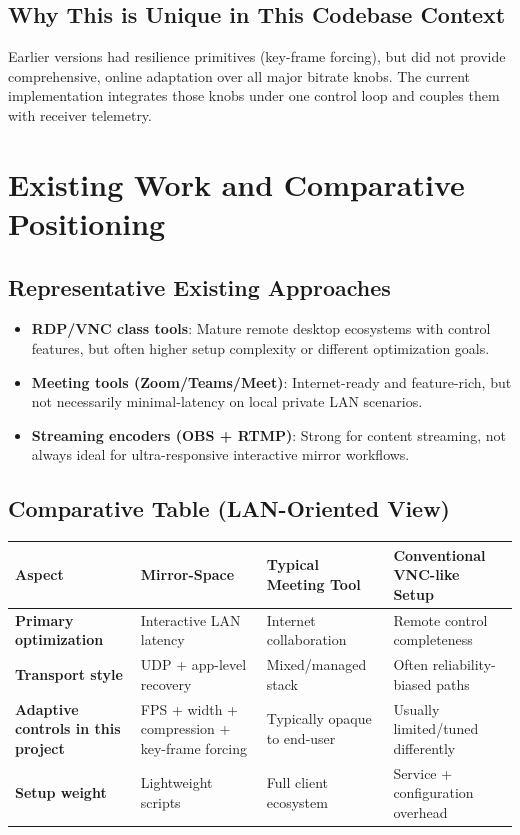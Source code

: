 \documentclass[12pt,a4paper]{article}
\begin{document}
\subsection{Why This is Unique in This Codebase Context}
Earlier versions had resilience primitives (key-frame forcing), but did not provide comprehensive, online adaptation over all major bitrate knobs. The current implementation integrates those knobs under one control loop and couples them with receiver telemetry.

\newpage

\section{Existing Work and Comparative Positioning}

\subsection{Representative Existing Approaches}
\begin{itemize}[leftmargin=*, itemsep=4pt]
  \item \textbf{RDP/VNC class tools}: Mature remote desktop ecosystems with control features, but often higher setup complexity or different optimization goals.
  \item \textbf{Meeting tools (Zoom/Teams/Meet)}: Internet-ready and feature-rich, but not necessarily minimal-latency on local private LAN scenarios.
  \item \textbf{Streaming encoders (OBS + RTMP)}: Strong for content streaming, not always ideal for ultra-responsive interactive mirror workflows.
\end{itemize}

\subsection{Comparative Table (LAN-Oriented View)}
\begin{center}
\renewcommand{\arraystretch}{1.3}
\begin{tabularx}{\textwidth}{>{\bfseries}l X X X}
\toprule
Aspect & Mirror-Space & Typical Meeting Tool & Conventional VNC-like Setup \\
\midrule
Primary optimization & Interactive LAN latency & Internet collaboration & Remote control completeness \\
Transport style & UDP + app-level recovery & Mixed/managed stack & Often reliability-biased paths \\
Adaptive controls in this project & FPS + width + compression + key-frame forcing & Typically opaque to end-user & Usually limited/tuned differently \\
Setup weight & Lightweight scripts & Full client ecosystem & Service + configuration overhead \\
\bottomrule
\end{tabularx}
\end{center}
\end{document}
